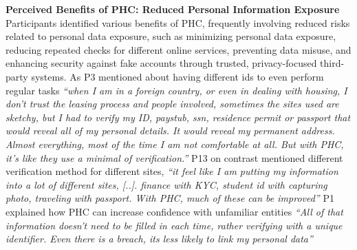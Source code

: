 \iffalse
\textbf{Perceived Benefits of PHC: Reduced Personal Information Exposure} %
Participants identified various benefits of PHC, frequently involving reduced risks related to personal data exposure, such as minimizing personal data exposure, reducing repeated checks for different online services, preventing data misuse, and enhancing security against fake accounts through trusted, privacy-focused third-party systems. As P3 mentioned about having different ids to even perform regular tasks \textit{``when I am in a foreign country, or even in dealing with housing, I don't trust the leasing process and people involved, sometimes the sites used are sketchy, but I had to verify my ID, paystub, ssn, residence permit or passport that would reveal all of my personal details. It would reveal my permanent address. Almost everything, most of the time I am not comfortable at all. But with PHC, it's like they use a minimal of verification.''} P13 on contrast mentioned different verification method for different sites, \textit{``it feel like I am putting my information into a lot of different sites, [..]. finance with KYC, student id with capturing photo, traveling with passport. With PHC, much of these can be improved''} P1 explained how PHC can increase confidence with unfamiliar entities \textit{``All of that information doesn't need to be filled in each time, rather verifying with a unique identifier. Even there is a breach, its less likely to link my personal data''}

